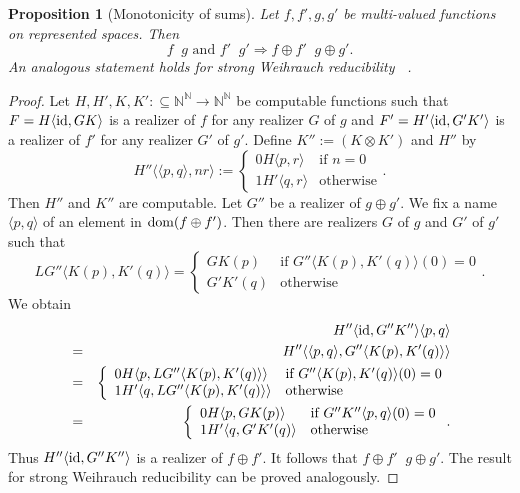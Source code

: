 \documentclass[jsl,10pt]{noasl}
\def\IN{{\mathbb{N}}}
\def\TO{\Longrightarrow}
\def\In{\subseteq}
\def\mto{\rightrightarrows}
\def\id{{\rm id}}
\def\dom{{\rm dom}}
\def\leqW{\mathop{\leq_{\mathrm{W}}}}
\def\leqSW{\mathop{\leq_{\mathrm{sW}}}}
\newtheorem{proposition}{Proposition}[section]
\begin{document}
\begin{proposition}[Monotonicity of sums]
\label{prop:monotone-sum}
Let $f,f',g,g'$ be multi-valued functions on represented spaces. Then
\[f\leqW g\mbox{ and }f'\leqW g'\TO f\oplus f'\leqW g\oplus g'.\]
An analogous statement holds for strong Weihrauch reducibility $\leqSW$.
\end{proposition}
\begin{proof}
Let $H,H',K,K':\In\IN^\IN\to\IN^\IN$ be computable functions such that
$F=H\langle\id,GK\rangle$ is a realizer of $f$ for any realizer $G$ of $g$
and $F'=H'\langle\id,G'K'\rangle$ is a realizer of $f'$ for any realizer $G'$ of $g'$.
Define $K'':=(K\otimes K')$ and $H''$ by 
\[H''\langle\langle p,q\rangle,nr\rangle:=\left\{\begin{array}{ll}
  0H\langle p,r\rangle  & \mbox{if $n=0$}\\
  1H'\langle q,r\rangle & \mbox{otherwise}
\end{array}\right..\]
Then $H''$ and $K''$ are computable.
Let $G''$ be a realizer of $g\oplus g'$.
We fix a name $\langle p,q\rangle$ of an element in $\dom(f\oplus f')$.
Then there are realizers $G$ of $g$ and $G'$ of $g'$ such that
\[LG''\langle K(p),K'(q)\rangle=\left\{\begin{array}{ll}
  GK(p) & \mbox{if $G''\langle K(p),K'(q)\rangle(0)=0$}\\
  G'K'(q) & \mbox{otherwise}
\end{array}\right..\]
We obtain
\begin{eqnarray*}
&&  H''\langle\id,G''K''\rangle\langle p,q\rangle\\
&=& H''\langle\langle p,q\rangle,G''\langle K(p),K'(q)\rangle\rangle\\
&=& \left\{\begin{array}{ll}
    0H\langle p,LG''\langle K(p),K'(q)\rangle\rangle & \mbox{if $G''\langle K(p),K'(q)\rangle(0)=0$}\\
    1H'\langle q,LG''\langle K(p),K'(q)\rangle\rangle & \mbox{otherwise}
    \end{array}\right.\\
&=& \left\{\begin{array}{ll}
    0H\langle p,GK(p)\rangle & \mbox{if $G''K''\langle p,q\rangle(0)=0$}\\
    1H'\langle q,G'K'(q)\rangle & \mbox{otherwise}
    \end{array}\right..\\
\end{eqnarray*}
Thus $H''\langle\id,G''K''\rangle$ is a realizer of $f\oplus f'$. 
It follows that $f\oplus f'\leqW g\oplus g'$.
The result for strong Weihrauch reducibility can be proved analogously.
\end{proof}
\end{document}
